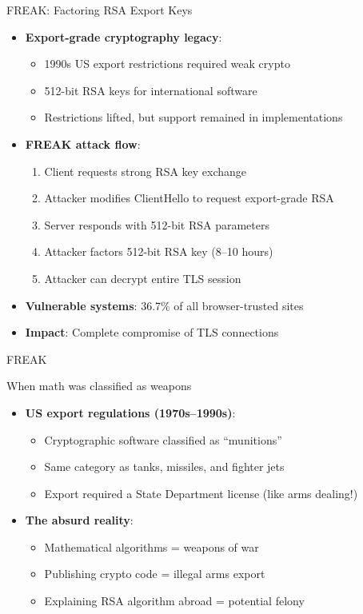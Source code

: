 \ifdefined\PRESENTATION\else\PassOptionsToClass{handout}{beamer}\fi\documentclass[aspectratio=169, lualatex]{beamer}
\begin{document}
\begin{frame}{FREAK: Factoring RSA Export Keys}
	\begin{itemize}[<+->]
		\item \textbf{Export-grade cryptography legacy}:
		      \begin{itemize}
			      \item 1990s US export restrictions required weak crypto
			      \item 512-bit RSA keys for international software
			      \item Restrictions lifted, but support remained in implementations
		      \end{itemize}
		\item \textbf{FREAK attack flow}:
		      \begin{enumerate}
			      \item Client requests strong RSA key exchange
			      \item Attacker modifies ClientHello to request export-grade RSA
			      \item Server responds with 512-bit RSA parameters
			      \item Attacker factors 512-bit RSA key (8--10 hours)
			      \item Attacker can decrypt entire TLS session
		      \end{enumerate}
		\item \textbf{Vulnerable systems}: 36.7\% of all browser-trusted sites
		\item \textbf{Impact}: Complete compromise of TLS connections
	\end{itemize}
\end{frame}

\begin{frame}{FREAK}
\end{frame}

\begin{frame}{When math was classified as weapons}
	\begin{itemize}[<+->]
		\item \textbf{US export regulations (1970s--1990s)}:
		      \begin{itemize}
			      \item Cryptographic software classified as ``munitions''
			      \item Same category as tanks, missiles, and fighter jets
			      \item Export required a State Department license (like arms dealing!)
		      \end{itemize}
		\item \textbf{The absurd reality}:
		      \begin{itemize}
			      \item Mathematical algorithms = weapons of war
			      \item Publishing crypto code = illegal arms export
			      \item Explaining RSA algorithm abroad = potential felony
		      \end{itemize}
	\end{itemize}
\end{frame}
\end{document}
